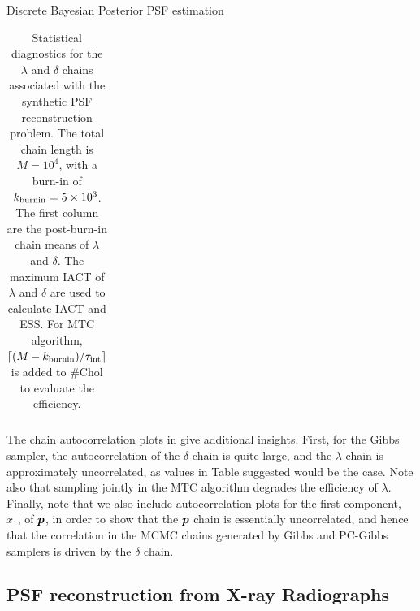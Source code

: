 \begin{chapter}{Discrete Bayesian Posterior PSF estimation}
\begin{table}[h]
\begin{center}
\begin{tabular}{l|ccccccc}
    \hline
  \end{tabular}
  \caption{ Statistical diagnostics for the $\lambda$ and $\delta$ chains associated with the synthetic PSF reconstruction problem. The total chain length is $M=10^4$, with a burn-in of $k_{\rm burnin} = 5\times10^3$. The first column are the post-burn-in chain means of $\lambda$ and $\delta$. The maximum IACT of $\lambda$ and $\delta$ are used to calculate IACT and ESS. For MTC algorithm, $\lceil(M-k_{\rm burnin})/\tau_{\rm int}\rceil$ is added to \#Chol to evaluate the efficiency.} \label{tab:PSFDeltaChain}
\end{center}
\end{table}

The chain autocorrelation plots in  give additional insights. 
First, for the Gibbs sampler, the autocorrelation of the $\delta$ chain is quite large, and the $\lambda$ chain is approximately uncorrelated, as values in Table  suggested would be the case. 
Note also that sampling jointly in the MTC algorithm degrades the efficiency of $\lambda$. 
Finally, note that we also include autocorrelation plots for the first component, $x_1$, of $\mbox{\boldmath$p$}$, in order to show that the $\mbox{\boldmath$p$}$ chain is essentially uncorrelated, and hence that the correlation in the MCMC chains generated by Gibbs and PC-Gibbs samplers is driven by the $\delta$ chain. 

\subsection{PSF reconstruction from X-ray Radiographs}\label{subsec:real data}



\end{chapter}
